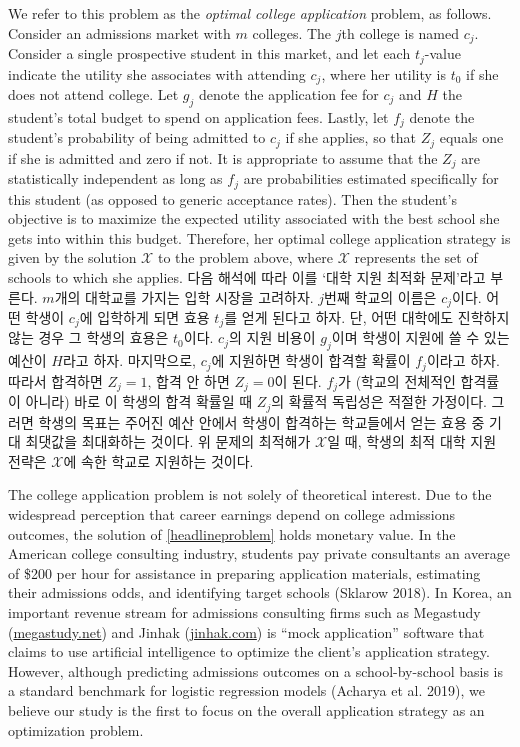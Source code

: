 \documentclass[11pt]{article} %
\theoremstyle{definition}
\theoremstyle{definition}
\begin{document}
\ifen
We refer to this problem as the \emph{optimal college application} problem, as follows. Consider an admissions market with $m$ colleges. The $j$th college is named $c_j$. Consider a single prospective student in this market, and let each $t_j$-value indicate the utility she associates with attending $c_j$, where her utility is $t_0$ if she does not attend college. Let $g_j$ denote the application fee for $c_j$ and $H$ the student's total budget to spend on application fees. Lastly, let $f_j$ denote the student's probability of being admitted to $c_j$ if she applies, so that $Z_j$ equals one if she is admitted and zero if not. It is appropriate to assume that the $Z_j$ are statistically independent as long as $f_j$ are probabilities estimated specifically for this student (as opposed to generic acceptance rates). Then the student's objective is to maximize the expected utility associated with the best school she gets into within this budget. Therefore, her optimal college application strategy is given by the solution $\mathcal{X}$ to the problem above, where $\mathcal{X}$ represents the set of schools to which she applies. 
\else
다음 해석에 따라 이를 `대학 지원 최적화 문제'라고 부른다. $m$개의 대학교를 가지는 입학 시장을 고려하자. $j$번째 학교의 이름은 $c_j$이다. 어떤 학생이 $c_j$에 입학하게 되면 효용 $t_j$를 얻게 된다고 하자. 단, 어떤 대학에도 진학하지 않는 경우 그 학생의 효용은 $t_0$이다. $c_j$의 지원 비용이 $g_j$이며 학생이 지원에 쓸 수 있는 예산이 $H$라고 하자. 마지막으로, $c_j$에 지원하면 학생이 합격할 확률이 $f_j$이라고 하자. 따라서 합격하면 $Z_j = 1$, 합격 안 하면 $Z_j = 0$이 된다. $f_j$가 (학교의 전체적인 합격률이 아니라) 바로 이 학생의 합격 확률일 때 $Z_j$의 확률적 독립성은 적절한 가정이다. 그러면 학생의 목표는 주어진 예산 안에서 학생이 합격하는 학교들에서 얻는 효용 중 기대 최댓값을 최대화하는 것이다. 위 문제의 최적해가 $\mathcal{X}$일 때, 학생의 최적 대학 지원 전략은 $\mathcal{X}$에  속한 학교로 지원하는 것이다.
\fi

\ifen
The college application problem is not solely of theoretical interest. Due to the widespread perception that career earnings depend on college admissions outcomes, the solution of \eqref{headlineproblem} holds monetary value. In the American college consulting industry, students pay private consultants an average of \$200 per hour for assistance in preparing application materials, estimating their admissions odds, and identifying target schools (Sklarow 2018). In Korea, an important revenue stream for admissions consulting firms such as Megastudy (\url{megastudy.net}) and Jinhak (\url{jinhak.com}) is ``mock application'' software that claims to use artificial intelligence to optimize the client's application strategy. However, although predicting admissions outcomes on a school-by-school basis is a standard benchmark for logistic regression models (Acharya et al. 2019), we believe our study is the first to focus on the overall application strategy as an optimization problem.
\end{document}

